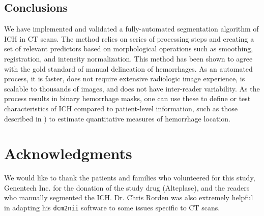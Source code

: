 \documentclass{elsarticle_nonatbib}\usepackage[]{graphicx}\usepackage[]{color}
\newcommand{\code}[1]{\texttt{#1}}
\begin{document}


\subsection{Conclusions}
We have implemented and validated a fully-automated segmentation algorithm of ICH in CT scans.  The method relies on series of processing steps and  creating a set of relevant predictors based on morphological operations such as smoothing, registration, and intensity normalization.  This method has been shown to agree with the gold standard of manual delineation of hemorrhages.  As an automated process, it is faster, does not require extensive radiologic image experience, is scalable to thousands of images, and does not have inter-reader variability.  As the process results in binary hemorrhage masks, one can use these to define or test characteristics of ICH compared to patient-level information, such as those described in \citet{muschelli2015quantitative}) to estimate quantitative measures of hemorrhage location.


\section*{Acknowledgments}
We would like to thank the patients and families who volunteered for this study, Genentech Inc. for the donation of the study drug (Alteplase), and the readers who manually segmented the ICH.  Dr. Chris Rorden was also extremely helpful in adapting his \code{dcm2nii} software to some issues specific to CT scans.
\end{document}
